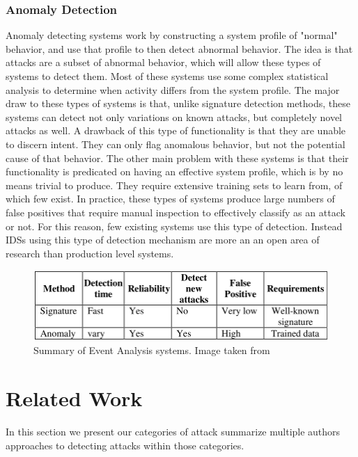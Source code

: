 \documentclass{acm_proc_article-sp}
\begin{document}
    	\subsubsection{Anomaly Detection}
    		Anomaly detecting systems work by constructing a system profile of "normal" behavior, and use that profile to then detect abnormal behavior. The idea is that attacks are a subset of abnormal behavior, which will allow these types of systems to detect them. Most of these systems use some complex statistical analysis to determine when activity differs from the system profile. The major draw to these types of systems is that, unlike signature detection methods, these systems can detect not only variations on known attacks, but completely novel attacks as well. A drawback of this type of functionality is that they are unable to discern intent. They can only flag anomalous behavior, but not the potential cause of that behavior. %
    		The other main problem with these systems is that their functionality is predicated on having an effective system profile, which is by no means trivial to produce. They require extensive training sets to learn from, of which few exist. In practice, these types of systems produce large numbers of false positives that require manual inspection to effectively classify as an attack or not. For this reason, few existing systems use this type of detection. Instead IDSs using this type of detection mechanism are more an an open area of research than production level systems. 
    	\begin{figure}[h!]
			\centering
			\includegraphics[width=.5\textwidth]{signatreVSanomaly.png}
			\caption{Summary of Event Analysis systems. Image taken from \cite{Alenezi2012}}
			\label{comparison}
	\end{figure}
\section{Related Work}
    In this section we present our categories of attack summarize multiple authors approaches to detecting attacks within those categories.
    
\end{document}
